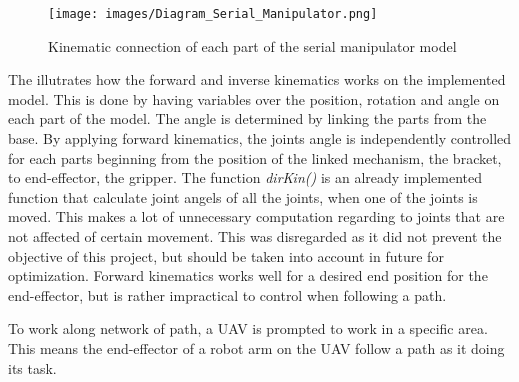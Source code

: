 \begin{figure}[ht]
    \centering
    \texttt{[image: images/Diagram\_Serial\_Manipulator.png]}
    \caption[Kinematic connection of  each part of the serial manipulator model]{Kinematic connection of  each part of the serial manipulator model}
    \label{fig:KinematicsSerialManipulator}
\end{figure}


The  illutrates how the forward and inverse kinematics works on the implemented model. This is done by having variables over the position, rotation and angle on each part of the model. The angle is determined by linking the parts from the base. By applying forward kinematics, the joints angle is independently controlled for each parts beginning from the position of the linked mechanism, the bracket, to end-effector, the gripper. The function \textit{dirKin()} is an already implemented function that calculate joint angels of all the joints, when one of the joints is moved. This makes a lot of unnecessary computation regarding to joints that are not affected of certain movement. This was disregarded as it did not prevent the objective of this project, but should be taken into account in future for optimization. Forward kinematics works well for a desired end position for the end-effector, but is rather impractical to control when following a path.

To work along network of path, a UAV is prompted to work in a specific area. This means the end-effector of a robot arm on the UAV follow a path as it doing its task. 



